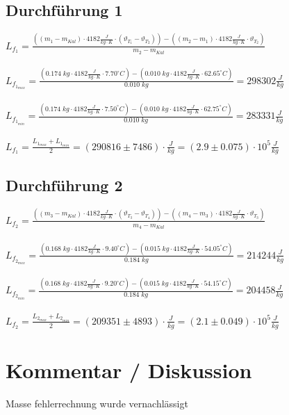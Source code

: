 \documentclass[a4paper,12pt]{article}
\begin{document}
\subsection{Durchführung 1}

$L_{f_1}=\displaystyle{\frac{\left(\left(m_1-m_{Kal}\right) \cdot 4182\frac{J}{kg \cdot K}\cdot \left(\vartheta_{T_1}-\vartheta_{T_2}\right)\right)-\left(\left(m_2-m_{1}\right)\cdot 4182 \frac{J}{kg \cdot K} \cdot \vartheta_{T_2}\right)}{m_2-m_{Kal}}} $\\\\

$L_{f_{1_{max}}} =\displaystyle{\frac{\left(0.174\;kg \cdot 4182\frac{J}{kg \cdot K}\cdot 7.70^{\circ}C \right)-\left(0.010\;kg\cdot 4182 \frac{J}{kg \cdot K} \cdot 62.65^{\circ}C\right)}{0.010\;kg}} = 298302\frac{J}{kg}$\\\\

$L_{f_{1_{min}}} =\displaystyle{\frac{\left(0.174\;kg \cdot 4182\frac{J}{kg \cdot K}\cdot 7.50^{\circ}C \right)-\left(0.010\;kg\cdot 4182 \frac{J}{kg \cdot K} \cdot 62.75^{\circ}C\right)}{0.010\;kg}} = 283331\frac{J}{kg}$\\\\

$L_{f_1}=\displaystyle{\frac{L_{1_{max}}+L_{1_{min}}}{2}=\left(290816\pm 7486\right) \cdot \frac{J}{kg}=\left(2.9\pm 0.075\right)\cdot 10^{5} \frac{J}{kg}}$

\subsection{Durchführung 2}

$L_{f_2}=\displaystyle{\frac{\left(\left(m_3-m_{Kal}\right) \cdot 4182\frac{J}{kg \cdot K}\cdot \left(\vartheta_{T_3}-\vartheta_{T_4}\right)\right)-\left(\left(m_4-m_{3}\right)\cdot 4182 \frac{J}{kg \cdot K} \cdot \vartheta_{T_3}\right)}{m_4-m_{Kal}}} $\\\\

$L_{f_{2_{max}}} =\displaystyle{\frac{\left(0.168\;kg \cdot 4182\frac{J}{kg \cdot K}\cdot 9.40^{\circ}C \right)-\left(0.015\;kg\cdot 4182 \frac{J}{kg \cdot K} \cdot 54.05^{\circ}C\right)}{0.184\;kg}} = 214244\frac{J}{kg}$\\\\

$L_{f_{2_{min}}} =\displaystyle{\frac{\left(0.168\;kg \cdot 4182\frac{J}{kg \cdot K}\cdot 9.20^{\circ}C \right)-\left(0.015\;kg\cdot 4182 \frac{J}{kg \cdot K} \cdot 54.15^{\circ}C\right)}{0.184\;kg}} = 204458\frac{J}{kg}$\\\\

$L_{f_2}=\displaystyle{\frac{L_{2_{max}}+L_{2_{min}}}{2}=\left(209351\pm 4893\right) \cdot \frac{J}{kg}=\left(2.1\pm 0.049\right)\cdot 10^{5} \frac{J}{kg}}$

\section{Kommentar / Diskussion}

Masse fehlerrechnung wurde vernachlässigt
\end{document}
